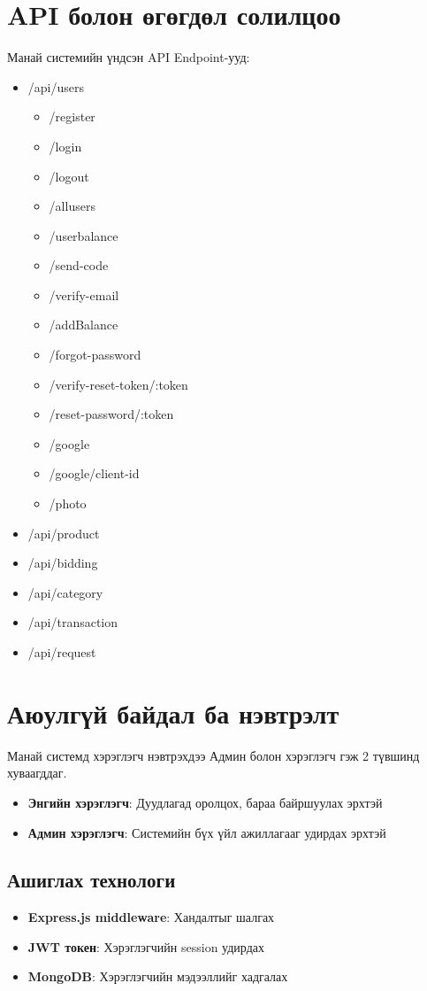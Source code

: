  \section{API болон өгөгдөл солилцоо}
 Манай системийн үндсэн API Endpoint-ууд:
  \begin{itemize}
    \item /api/users
    \begin{itemize}
        \item /register
        \item /login
        \item /logout
        \item /allusers
        \item /userbalance
        \item /send-code
        \item /verify-email
        \item /addBalance
        \item /forgot-password
        \item /verify-reset-token/:token
        \item /reset-password/:token
         \item /google
         \item /google/client-id
         \item /photo
        
    \end{itemize}
    \item /api/product
    \item /api/bidding
    \item /api/category
    \item /api/transaction
    \item /api/request
\end{itemize}
 \section{Аюулгүй байдал ба нэвтрэлт}
Манай системд хэрэглэгч нэвтрэхдээ Админ болон хэрэглэгч гэж 2 түвшинд хуваагддаг.
\begin{itemize}
\item \textbf{Энгийн хэрэглэгч}: Дуудлагад оролцох, бараа байршуулах эрхтэй
\item \textbf{Админ хэрэглэгч}: Системийн бүх үйл ажиллагааг удирдах эрхтэй
\end{itemize}
\newline
\subsection{Ашиглах технологи}
\begin{itemize}
\item \textbf{Express.js middleware}: Хандалтыг шалгах
\item \textbf{JWT токен}: Хэрэглэгчийн session удирдах
\item \textbf{MongoDB}: Хэрэглэгчийн мэдээллийг хадгалах
\end{itemize}
